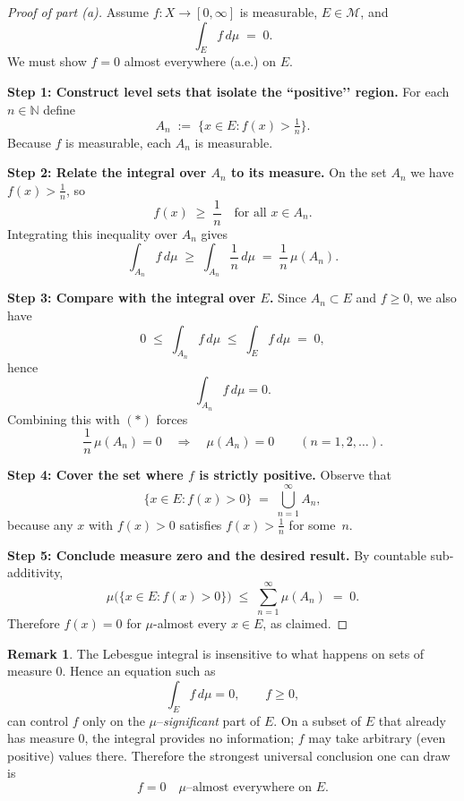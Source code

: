\documentclass[12pt]{article}
\theoremstyle{definition} %
\newtheorem{remark}{Remark}
\theoremstyle{plain} %
\begin{document}
\begin{proof}[Proof of part (a)]
  Assume $f:X\to[0,\infty]$ is measurable, $E\in\mathcal{M}$, and
  \[
      \int_{E} f\,d\mu \;=\;0.
  \]
  We must show $f=0$ almost everywhere (a.e.) on $E$.

  \medskip\noindent
  \textbf{Step 1:  Construct level sets that isolate the ``positive’’ region.}  
  For each $n\in\mathbb{N}$ define
  \[
      A_n \;:=\;\bigl\{x\in E : f(x)>\tfrac1n \bigr\}.
  \]
  Because $f$ is measurable, each $A_n$ is measurable.

  \medskip\noindent
  \textbf{Step 2:  Relate the integral over $A_n$ to its measure.}  
  On the set $A_n$ we have $f(x)>\tfrac1n$, so
  \[
      f(x) \;\ge\;\frac1n\quad\text{for all }x\in A_n .
  \]
  Integrating this inequality over $A_n$ gives
  \[
      \int_{A_n} f\,d\mu
      \;\ge\;
      \int_{A_n} \frac1n \,d\mu
      \;=\;
      \frac1n\,\mu(A_n).
  \tag{$\ast$}
  \]

  \medskip\noindent
  \textbf{Step 3:  Compare with the integral over $E$.}  
  Since $A_n\subset E$ and $f\ge0$, we also have
  \[
      0 \;\le\;\int_{A_n} f\,d\mu
      \;\le\;
      \int_{E} f\,d\mu
      \;=\;0,
  \]
  hence
  \[
      \int_{A_n} f\,d\mu = 0.
  \]
  Combining this with $(\ast)$ forces
  \[
      \frac1n\,\mu(A_n)=0
      \quad\Longrightarrow\quad
      \mu(A_n)=0
      \qquad (n=1,2,\dots).
  \]

  \medskip\noindent
  \textbf{Step 4:  Cover the set where $f$ is strictly positive.}  
  Observe that
  \[
      \bigl\{x\in E : f(x)>0\bigr\}
      \;=\;
      \bigcup_{n=1}^{\infty} A_n ,
  \]
  because any $x$ with $f(x)>0$ satisfies $f(x)>\tfrac1n$ for some~$n$.

  \medskip\noindent
  \textbf{Step 5:  Conclude measure zero and the desired result.}  
  By countable sub-additivity,
  \[
      \mu\bigl(\{x\in E : f(x)>0\}\bigr)
      \;\le\;
      \sum_{n=1}^{\infty}\mu(A_n)
      \;=\;0.
  \]
  Therefore $f(x)=0$ for $\mu$-almost every $x\in E$, as claimed.
\end{proof}
\pagebreak

\begin{remark}
  The Lebesgue integral is insensitive to what happens on sets of
  measure\/ $0$.  
  Hence an equation such as
  \[
      \int_E f\,d\mu = 0, 
      \qquad f\ge 0,
  \]
  can control $f$ only on the $\mu$--\emph{significant} part of $E$.
  On a subset of $E$ that already has measure $0$, the integral
  provides no information; $f$ may take arbitrary (even positive)
  values there.  
  Therefore the strongest universal conclusion one can draw is
  \[
      f=0 \quad\text{$\mu$--almost everywhere on $E$.}
  \]
\end{remark}
\end{document}
